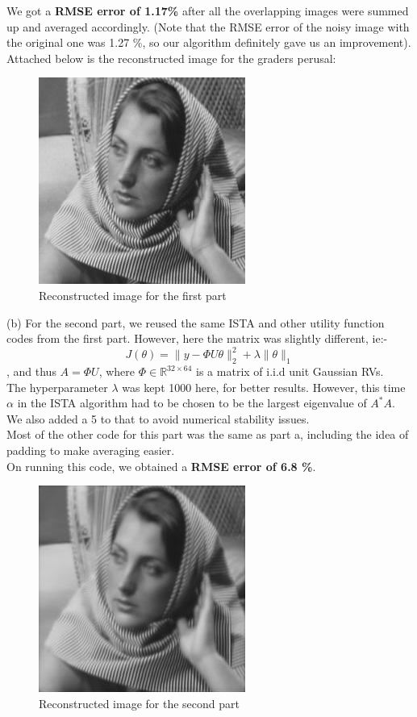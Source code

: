 \documentclass[a4paper,11pt]{article}
\numberwithin{definition}{section}
\numberwithin{mytheorem}{subsection}
\begin{document}
We got a \textbf{RMSE error of 1.17\%} after all the overlapping images were summed up and averaged accordingly. (Note that the RMSE error of the noisy image with the original one was 1.27 \%, so our algorithm definitely gave us an improvement).\\
Attached below is the reconstructed image for the graders perusal:
\begin{figure}[H]
    \includegraphics{Reconstructed_Image_1a.jpg}
    \caption{Reconstructed image for the first part}
\end{figure}
(b) For the second part, we reused the same ISTA and other utility function codes from the first part. However, here the matrix was slightly different, ie:- 
$$J(\theta) = \lVert y - \Phi U\theta\rVert^2_2 + \lambda\lVert\theta\rVert_1$$
, and thus $A = \Phi U$, where $\Phi\in\mathbb{R}^{32\times 64}$ is a matrix of i.i.d unit Gaussian RVs. \\
The hyperparameter $\lambda$ was kept 1000 here, for better results. However, this time $\alpha$ in the ISTA algorithm had to be chosen to be the largest eigenvalue of $A^*A$. We also added a 5 to that to avoid numerical stability issues.\\
Most of the other code for this part was the same as part a, including the idea of padding to make averaging easier.\\
On running this code, we obtained a \textbf{RMSE error of 6.8 \%}.  
 \begin{figure}[H]
     \includegraphics{Reconstructed_Image_1b.jpg}
     \caption{Reconstructed image for the second part}
 \end{figure}
\end{document}
